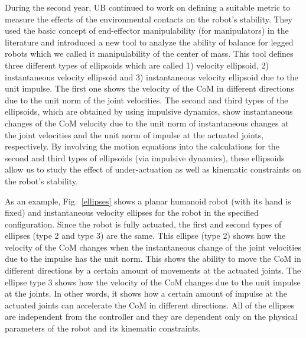 During the second year, UB continued to work on defining a suitable metric to
measure the effects of the environmental contacts on the robot's stability.
They used the basic concept of end-effector manipulability (for manipulators)
in the literature and introduced a new tool to analyze the ability of balance
for legged robots which we called it manipulability of the center of mass.
This tool defines three different types of ellipsoids which are called 1)
velocity ellipsoid, 2) instantaneous velocity ellipsoid and 3) instantaneous
velocity ellipsoid due to the unit impulse.  The first one shows the velocity
of the CoM in different directions due to the unit norm of the joint
velocities.  The second and third types of the ellipsoids, which are obtained
by using impulsive dynamics, show instantaneous changes of the CoM velocity
due to the unit norm of instantaneous changes at the joint velocities and the
unit norm of impulse at the actuated joints, respectively.  By involving the
motion equations into the calculations for the second and third types of
ellipsoids (via impulsive dynamics), these ellipsoids allow us to study the
effect of under-actuation as well as kinematic constraints on the robot's
stability.

As an example, Fig.~\ref{ellipses} shows a planar humanoid robot (with its hand 
is fixed) and instantaneous velocity ellipses for the robot in the
specified configuration. Since the robot is fully actuated, the first and
second types of ellipses (type 2 and type 3) are the same. This ellipse (type
2) shows how the velocity of the CoM changes when the instantaneous change of
the joint velocities due to the impulse has the unit norm. This shows the
ability to move the CoM in different directions by a certain amount of
movements at the actuated joints. The ellipse type 3 shows how the velocity
of the CoM changes due to the unit impulse at the joints. In other words, it
shows how a certain amount of impulse at the actuated joints can accelerate
the CoM in different directions. All of the ellipses are independent from the
controller and they are dependent only on the physical parameters of the robot
and its kinematic constraints.

